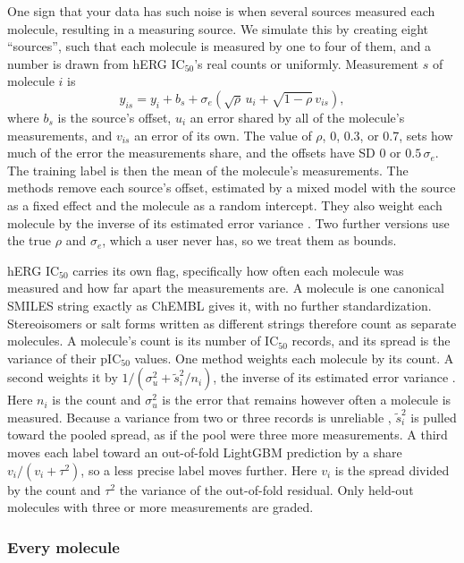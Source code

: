 One sign that your data has such noise is when several sources measured each molecule, resulting in a measuring source. We simulate this by creating eight ``sources'', such that each molecule is measured by one to four of them, and a number is drawn from hERG IC$_{50}$'s real counts or uniformly. Measurement $s$ of molecule $i$ is
\begin{equation}
y_{is} = y_i + b_s + \sigma_e\left(\sqrt{\rho}\,u_i + \sqrt{1-\rho}\,v_{is}\right),
\end{equation}
where $b_s$ is the source's offset, $u_i$ an error shared by all of the molecule's measurements, and $v_{is}$ an error of its own. The value of $\rho$, 0, 0.3, or 0.7, sets how much of the error the measurements share, and the offsets have SD 0 or $0.5\,\sigma_e$. The training label is then the mean of the molecule's measurements. The methods remove each source's offset, estimated by a mixed model with the source as a fixed effect and the molecule as a random intercept. They also weight each molecule by the inverse of its estimated error variance \citep{hedges1985meta}. Two further versions use the true $\rho$ and $\sigma_e$, which a user never has, so we treat them as bounds.

hERG IC$_{50}$ carries its own flag, specifically how often each molecule was measured and how far apart the measurements are. A molecule is one canonical SMILES string exactly as ChEMBL gives it, with no further standardization. Stereoisomers or salt forms written as different strings therefore count as separate molecules. A molecule's count is its number of IC$_{50}$ records, and its spread is the variance of their pIC$_{50}$ values. One method weights each molecule by its count. A second weights it by $1/(\sigma_u^2 + \tilde s_i^2/n_i)$, the inverse of its estimated error variance \citep{hedges1985meta}. Here $n_i$ is the count and $\sigma_u^2$ is the error that remains however often a molecule is measured. Because a variance from two or three records is unreliable \citep{smyth2004limma}, $\tilde s_i^2$ is pulled toward the pooled spread, as if the pool were three more measurements. A third moves each label toward an out-of-fold LightGBM prediction by a share $v_i/(v_i + \tau^2)$, so a less precise label moves further. Here $v_i$ is the spread divided by the count and $\tau^2$ the variance of the out-of-fold residual. Only held-out molecules with three or more measurements are graded.

\subsubsection{Every molecule}

